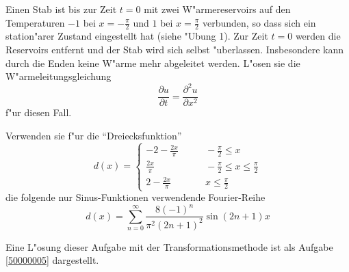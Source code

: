 Einen Stab ist bis zur Zeit $t=0$ mit zwei
W"armereservoirs auf den Temperaturen $-1$ bei $x=-\frac{\pi}2$ und
$1$ bei $x=\frac{\pi}2$ verbunden,
so dass sich ein station"arer Zustand eingestellt hat (siehe
"Ubung 1). Zur Zeit $t=0$ werden die Reservoirs entfernt und der
Stab wird sich selbst "uberlassen. Insbesondere kann durch die
Enden keine W"arme mehr abgeleitet werden. L"osen sie die
W"armeleitungsgleichung
\[
\frac{\partial u}{\partial t}=\frac{\partial^2 u}{\partial x^2}
\]
f"ur diesen Fall.

\begin{hinweis}
Verwenden sie f"ur die
``Dreiecksfunktion''
\[
d(x)
=
\begin{cases}
\displaystyle-2-\frac{2x}{\pi}&\qquad \displaystyle-\frac{\pi}2\le x\\
\displaystyle\frac{2x}{\pi}&\qquad \displaystyle-\frac{\pi}2\le x\le \frac{\pi}2\\
\displaystyle2-\frac{2x}{\pi}&\qquad \displaystyle x\le\frac{\pi}2
\end{cases}
\]
die folgende nur Sinus-Funktionen
verwendende Fourier-Reihe
\[
d(x)=\sum_{n=0}^\infty \frac{8(-1)^n}{\pi^2(2n+1)^2}\sin (2n+1)x
\]
\end{hinweis}

\begin{hinweis}
Eine L"osung dieser Aufgabe mit der Transformationsmethode ist als
Aufgabe \ref{50000005} dargestellt.
\end{hinweis}

